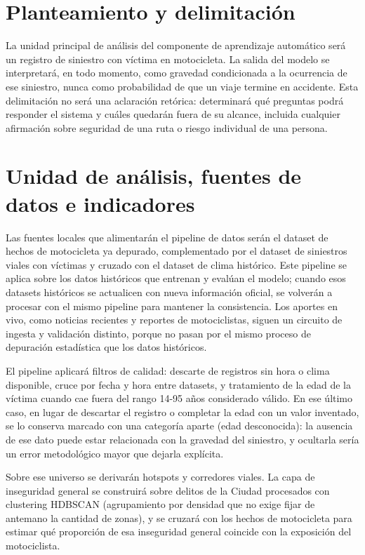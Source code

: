 \section{Planteamiento y delimitación}

La unidad principal de análisis del componente de aprendizaje automático
será un registro de siniestro con víctima en motocicleta. La salida del
modelo se interpretará, en todo momento, como gravedad condicionada a la
ocurrencia de ese siniestro, nunca como probabilidad de que un viaje
termine en accidente. Esta delimitación no será una aclaración retórica:
determinará qué preguntas podrá responder el sistema y cuáles quedarán
fuera de su alcance, incluida cualquier afirmación sobre seguridad de
una ruta o riesgo individual de una persona.

\section{Unidad de análisis, fuentes de datos e indicadores}

Las fuentes locales que alimentarán el pipeline de datos serán el
dataset de hechos de motocicleta ya depurado, complementado por el
dataset de siniestros viales con víctimas y cruzado con el dataset de
clima histórico. Este pipeline se aplica sobre los datos históricos que
entrenan y evalúan el modelo; cuando esos datasets históricos se
actualicen con nueva información oficial, se volverán a procesar con el
mismo pipeline para mantener la consistencia. Los aportes en vivo, como
noticias recientes y reportes de motociclistas, siguen un circuito de
ingesta y validación distinto, porque no pasan por el mismo proceso de
depuración estadística que los datos históricos.

El pipeline aplicará filtros de calidad: descarte de registros sin hora
o clima disponible, cruce por fecha y hora entre datasets, y tratamiento
de la edad de la víctima cuando cae fuera del rango 14-95 años
considerado válido. En ese último caso, en lugar de descartar el
registro o completar la edad con un valor inventado, se lo conserva
marcado con una categoría aparte (edad desconocida): la ausencia de ese
dato puede estar relacionada con la gravedad del siniestro, y ocultarla
sería un error metodológico mayor que dejarla explícita.

Sobre ese universo se derivarán hotspots y corredores viales. La capa de
inseguridad general se construirá sobre delitos de la Ciudad procesados
con clustering HDBSCAN (agrupamiento por densidad que no exige fijar de
antemano la cantidad de zonas), y se cruzará con los hechos de
motocicleta para estimar qué proporción de esa inseguridad general
coincide con la exposición del motociclista.

